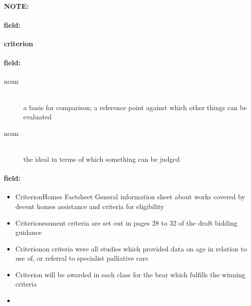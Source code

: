 \documentclass[12pt]{article}
\newenvironment{note}{\paragraph{NOTE:}}{}
\newenvironment{field}{\paragraph{field:}}{}
\begin{document}
\begin{note}
\begin{field}
\textbf{\large criterion}
\end{field}


\begin{field}
\begin{description}
\item[noun] \hfill \\ 
a basis for comparison; a reference point against which other things can be evaluated

\item[noun] \hfill \\ 
the ideal in terms of which something can be judged

\end{description}
\end{field}

\begin{field}
\begin{itemize}
\item CriterionHomes Factsheet General information sheet about works covered by decent homes assistance and criteria for eligibility
\item Criterionessment criteria are set out in pages 28 to 32 of the draft bidding guidance
\item Criterionon criteria were all studies which provided data on age in relation to use of, or referral to specialist palliative care
\item Criterion will be awarded in each class for the bear which fulfills the winning criteria
\item 
\end{itemize}
\end{field}
\end{note}
\end{document}

